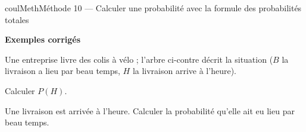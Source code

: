 \documentclass[11pt,a4paper]{article}
\makeatletter
\newcounter{lycee@signet}
\newcommand{\signet}[3][]{\stepcounter{lycee@signet}%
  \edef\lycee@dest{\if\relax\detokenize{#1}\relax
    signet.\arabic{lycee@signet}\else#1\fi}%
  \hypertarget{\lycee@dest}{}\bookmark[level=#2,dest=\lycee@dest]{#3}}
\newcounter{methode}
\newenvironment{methodebox}[1][Méthode]{\stepcounter{methode}%
  \begin{boitecours}[phantom={\signet[methode-\arabic{methode}]{2}{#1}}]{coulMeth}{#1}}%
  {\end{boitecours}}
\newcommand{\etape}[1]{\par\smallskip\textbf{\color{coulMeth}#1}\par\nobreak\smallskip}
\newcommand{\etapeexemples}{\etape{Exemples corrigés}}
\makeatother
\begin{document}
\begin{methodebox}[Méthode 10 --- Calculer une probabilité avec la formule des probabilités totales]
\etapeexemples
\begin{minipage}[c]{0.5\linewidth}\raggedright
Une entreprise livre des colis à vélo ; l'arbre ci-contre décrit la situation ($B$ \og la
livraison a lieu par beau temps\fg{}, $H$ \og la livraison arrive à l'heure\fg{}).
\begin{questions}[label=\alph*)]
  \item Calculer $P(H)$.
  \item Une livraison est arrivée à l'heure. Calculer la probabilité qu'elle ait eu lieu
        par beau temps.
\end{questions}
\end{minipage}\hfill
\begin{minipage}[c]{0.46\linewidth}\centering
{}
\end{minipage}


\end{methodebox}
\end{document}
